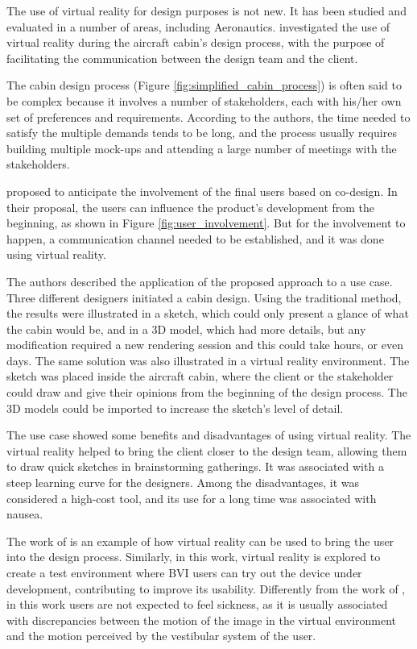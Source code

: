 
The use of virtual reality for design purposes is not new. It has been studied and evaluated in a number of areas, including Aeronautics.  investigated the use of virtual reality during the aircraft cabin’s design process, with the purpose of facilitating the communication between the design team and the client. 

The cabin design process (Figure \ref{fig:simplified_cabin_process}) is often said to be complex because it involves a number of stakeholders, each with his/her own set of preferences and requirements. According to the authors, the time needed to satisfy the multiple demands tends to be long, and the process usually requires building multiple mock-ups and attending a large number of meetings with the stakeholders. 



 proposed to anticipate the involvement of the final users based on co-design. In their proposal, the users can influence the product’s development from the beginning, as shown in Figure \ref{fig:user_involvement}. But for the involvement to happen, a communication channel needed to be established, and it was done using virtual reality.



The authors described the application of the proposed approach to a use case. Three different designers initiated a cabin design. Using the traditional method, the results were illustrated in a sketch, which could only present a glance of what the cabin would be, and in a 3D model, which had more details, but any modification required a new rendering session and this could take hours, or even days. The same solution was also illustrated in a virtual reality environment. The sketch was placed inside the aircraft cabin, where the client or the stakeholder could draw and give their opinions from the beginning of the design process. The 3D models could be imported to increase the sketch’s level of detail.

The use case showed some benefits and disadvantages of using virtual reality. The virtual reality helped to bring the client closer to the design team, allowing them to draw quick sketches in brainstorming gatherings. It was associated with a steep learning curve for the designers. Among the disadvantages, it was considered a high-cost tool, and its use for a long time was associated with nausea. 

The work of  is an example of how virtual reality can be used to bring the user into the design process. Similarly, in this work, virtual reality is explored to create a test environment where BVI users can try out the device under development, contributing to improve its usability. Differently from the work of , in this work users are not expected to feel sickness, as it is usually associated with discrepancies between the motion of the image in the virtual environment and the motion perceived by the vestibular system of the user.